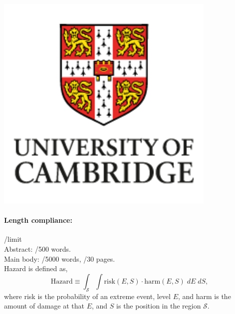 \begin{titlepage}
\begin{center}
{    
        }

       \vspace{0.4cm}


       \vspace{0.3cm}


       \includegraphics[width=0.13\linewidth]{images/logos/UC.png}
       \vspace{0.8cm}
   \end{center}
\end{titlepage}

\newpage
  \vspace{-50pt}


  \tableofcontents

  \paragraph{Length compliance:}

  /limit \\
  Abstract:  \abwords/500 words. \\
  Main body: \words/5000 words, \pages/30 pages.\\

 
 Hazard is defined as,
 \begin{equation*}
 \mathrm{Hazard}\equiv \int_{\mathcal{S}} \int \mathrm{risk}(E, S)  \cdot \mathrm{harm}(E, S)\; dE\; dS,
 \end{equation*}
 where risk is the probability of an extreme event, level $E$,
 and harm is the amount of damage at that $E$, and $S$ is the position
 in the region $\mathcal{S}$.
  \thispagestyle{empty}

\newpage
